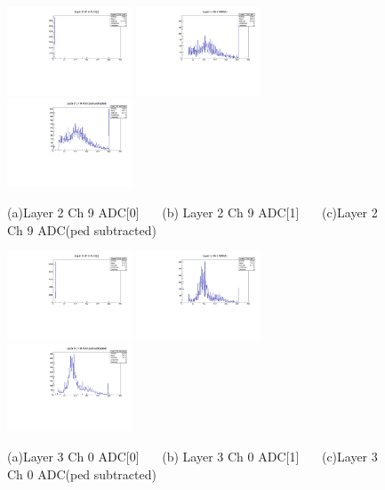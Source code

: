 \documentclass[a4paper,11pt]{article}
\theoremstyle{mytheor}
\begin{document}
\begin{figure}[H] 
\vspace*{-0.3cm} 
\includegraphics[width=0.33\textwidth,scale=0.5,trim=0 0 0 0,clip]{plotsdir/file0_muons-Layer2_Ch9_adc0-1.pdf} 
\includegraphics[width=0.33\textwidth,scale=0.5,trim=0 0 0 0,clip]{plotsdir/file0_muons-Layer2_Ch9_adc1-1.pdf} 
\includegraphics[width=0.33\textwidth,scale=0.5,trim=0 0 0 0,clip]{plotsdir/file0_muons-Layer2_Ch9_adcPedsub-1.pdf} 
\caption{(a)Layer 2 Ch 9 ADC[0] ~~~(b) Layer 2 Ch 9 ADC[1] ~~~(c)Layer 2 Ch 9 ADC(ped subtracted) } 
\end{figure} 
\begin{figure}[H] 
\vspace*{-0.3cm} 
\includegraphics[width=0.33\textwidth,scale=0.5,trim=0 0 0 0,clip]{plotsdir/file0_muons-Layer3_Ch0_adc0-1.pdf} 
\includegraphics[width=0.33\textwidth,scale=0.5,trim=0 0 0 0,clip]{plotsdir/file0_muons-Layer3_Ch0_adc1-1.pdf} 
\includegraphics[width=0.33\textwidth,scale=0.5,trim=0 0 0 0,clip]{plotsdir/file0_muons-Layer3_Ch0_adcPedsub-1.pdf} 
\caption{(a)Layer 3 Ch 0 ADC[0] ~~~(b) Layer 3 Ch 0 ADC[1] ~~~(c)Layer 3 Ch 0 ADC(ped subtracted) } 
\end{figure} 
\end{document}
